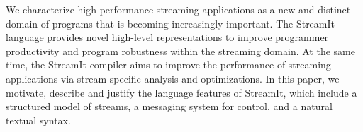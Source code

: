 We characterize high-performance streaming applications as a new and
distinct domain of programs that is becoming increasingly important.
The StreamIt language provides novel high-level representations to
improve programmer productivity and program robustness within the
streaming domain.  At the same time, the StreamIt compiler aims to
improve the performance of streaming applications via stream-specific
analysis and optimizations.  In this paper, we motivate, describe and
justify the language features of StreamIt, which include a structured
model of streams, a messaging system for control, and a natural
textual syntax.


